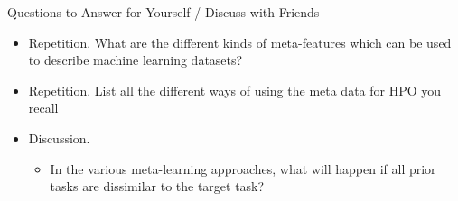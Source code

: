 \begin{frame}[c]{Questions to Answer for Yourself / Discuss with Friends}

\begin{itemize}
    \item \alert{Repetition.} What are the different kinds of meta-features which can be used to describe machine learning datasets?
    
    \medskip

    \item \alert{Repetition.} List all the different ways of using the meta data for HPO you recall
    \medskip

    \item \alert{Discussion.}
    \begin{itemize}
        \item In the various meta-learning approaches, what will happen if all prior tasks are dissimilar to the target task?
    \end{itemize}


\end{itemize}

\end{frame}